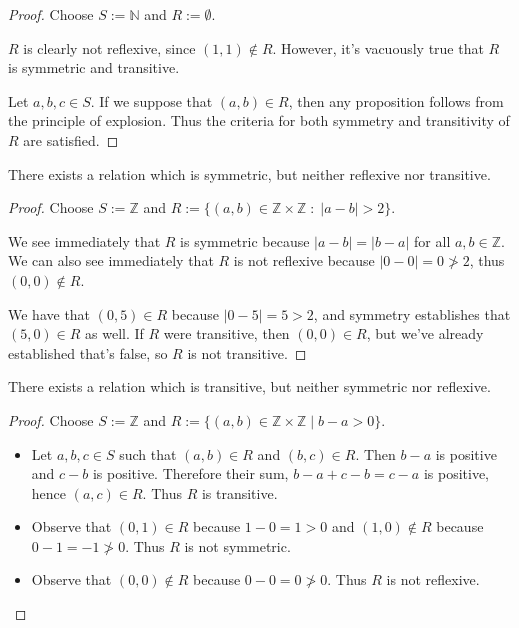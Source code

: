 \documentclass[12pt]{article}
\newcommand{\Z}{\mathbb{Z}}
\newcommand{\N}{\mathbb{N}}
\newenvironment{ex}[2][Problem]{\begin{trivlist}
\item[\hskip \labelsep {\bfseries #1}\hskip \labelsep {\bfseries #2.}]}{\end{trivlist}}
\begin{document}
\begin{proof}
    Choose $S:=\N$ and $R:=\emptyset$.

    $R$ is clearly not reflexive, since $(1, 1)\notin R$.
    However, it's vacuously true that $R$ is symmetric and transitive.

    Let $a, b, c\in S$. If we suppose that $(a, b)\in R$, then any proposition
    follows from the principle of explosion. Thus the criteria for both
    symmetry and transitivity of $R$ are satisfied.

\end{proof}


\begin{ex}{10} [-R+S-T]
    There exists a relation which is symmetric, but neither reflexive nor transitive.
\end{ex}

\begin{proof}
    Choose $S:=\Z$ and $R:=\{(a,b)\in\Z\times\Z \;:\; |a-b| > 2\}$.

    We see immediately that $R$ is symmetric because $|a-b|=|b-a|$ for all
    $a, b\in\Z$. We can also see immediately that $R$ is not reflexive because
    $|0-0|=0\not>2$, thus $(0, 0)\notin R$.

    We have that $(0,5)\in R$ because $|0-5|=5>2$, and symmetry establishes that
    $(5, 0)\in R$ as well. If $R$ were transitive, then $(0, 0)\in R$, but we've already
    established that's false, so $R$ is not transitive.
\end{proof}


\begin{ex}{11} [-R-S+T]
    There exists a relation which is transitive, but neither symmetric nor reflexive.
\end{ex}

\begin{proof}
    Choose $S:=\Z$ and $R:=\{(a,b)\in\Z\times\Z\;|\;b-a>0\}$.

    \begin{itemize}
        \item Let $a, b, c\in S$ such that $(a, b)\in R$ and $(b, c)\in R$.
            Then $b-a$ is positive and $c-b$ is positive. Therefore their sum,
            $b-a+c-b=c-a$ is positive, hence $(a, c)\in R$. Thus $R$ is transitive.
        \item Observe that $(0, 1)\in R$ because $1-0=1>0$ and $(1, 0)\notin R$
            because $0-1=-1\not>0$. Thus $R$ is not symmetric.
        \item Observe that $(0, 0)\notin R$ because $0-0=0\not>0$. Thus
            $R$ is not reflexive.
    \end{itemize}
\end{proof}
\end{document}
